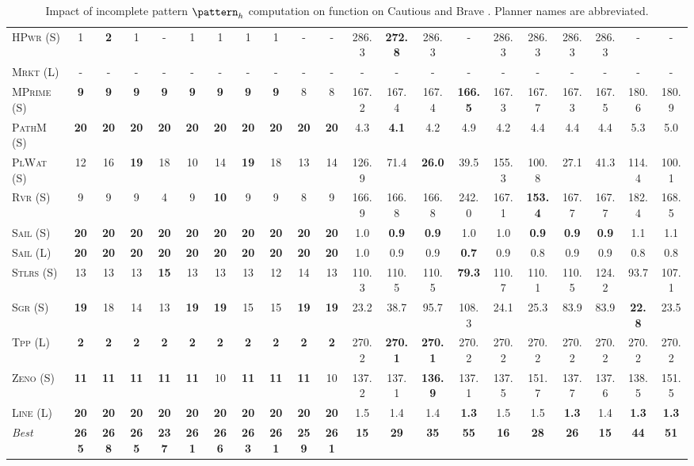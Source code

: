 \documentclass[11pt,landscape]{article}
\begin{document}
\begin{table}[tb]
{\begin{tabular}{|l||cccccccccc||cccccccccc||}
\textsc{HPwr} (S)&1&\textbf{2}&1&-&1&1&1&1&-&-&286.3&\textbf{272.8}&286.3&-&286.3&286.3&286.3&286.3&-&-\\
\textsc{Mrkt} (L)&-&-&-&-&-&-&-&-&-&-&-&-&-&-&-&-&-&-&-&-\\
\textsc{MPrime} (S)&\textbf{9}&\textbf{9}&\textbf{9}&\textbf{9}&\textbf{9}&\textbf{9}&\textbf{9}&\textbf{9}&8&8&167.2&167.4&167.4&\textbf{166.5}&167.3&167.7&167.3&167.5&180.6&180.9\\
\textsc{PathM} (S)&\textbf{20}&\textbf{20}&\textbf{20}&\textbf{20}&\textbf{20}&\textbf{20}&\textbf{20}&\textbf{20}&\textbf{20}&\textbf{20}&4.3&\textbf{4.1}&4.2&4.9&4.2&4.4&4.4&4.4&5.3&5.0\\
\textsc{PlWat} (S)&12&16&\textbf{19}&18&10&14&\textbf{19}&18&13&14&126.9&71.4&\textbf{26.0}&39.5&155.3&100.8&27.1&41.3&114.4&100.1\\
\textsc{Rvr} (S)&9&9&9&4&9&\textbf{10}&9&9&8&9&166.9&166.8&166.8&242.0&167.1&\textbf{153.4}&167.7&167.7&182.4&168.5\\
\textsc{Sail} (S)&\textbf{20}&\textbf{20}&\textbf{20}&\textbf{20}&\textbf{20}&\textbf{20}&\textbf{20}&\textbf{20}&\textbf{20}&\textbf{20}&1.0&\textbf{0.9}&\textbf{0.9}&1.0&1.0&\textbf{0.9}&\textbf{0.9}&\textbf{0.9}&1.1&1.1\\
\textsc{Sail} (L)&\textbf{20}&\textbf{20}&\textbf{20}&\textbf{20}&\textbf{20}&\textbf{20}&\textbf{20}&\textbf{20}&\textbf{20}&\textbf{20}&1.0&0.9&0.9&\textbf{0.7}&0.9&0.8&0.9&0.9&0.8&0.8\\
\textsc{Stlrs} (S)&13&13&13&\textbf{15}&13&13&13&12&14&13&110.3&110.5&110.5&\textbf{79.3}&110.7&110.1&110.5&124.2&93.7&107.1\\
\textsc{Sgr} (S)&\textbf{19}&18&14&13&\textbf{19}&\textbf{19}&15&15&\textbf{19}&\textbf{19}&23.2&38.7&95.7&108.3&24.1&25.3&83.9&83.9&\textbf{22.8}&23.5\\
\textsc{Tpp} (L)&\textbf{2}&\textbf{2}&\textbf{2}&\textbf{2}&\textbf{2}&\textbf{2}&\textbf{2}&\textbf{2}&\textbf{2}&\textbf{2}&270.2&\textbf{270.1}&\textbf{270.1}&270.2&270.2&270.2&270.2&270.2&270.2&270.2\\
\textsc{Zeno} (S)&\textbf{11}&\textbf{11}&\textbf{11}&\textbf{11}&\textbf{11}&10&\textbf{11}&\textbf{11}&\textbf{11}&10&137.2&137.1&\textbf{136.9}&137.1&137.5&151.7&137.7&137.6&138.5&151.5\\
\textsc{Line} (L)&\textbf{20}&\textbf{20}&\textbf{20}&\textbf{20}&\textbf{20}&\textbf{20}&\textbf{20}&\textbf{20}&\textbf{20}&\textbf{20}&1.5&1.4&1.4&\textbf{1.3}&1.5&1.5&\textbf{1.3}&1.4&\textbf{1.3}&\textbf{1.3}
\\\hline
\textit{Best}&\textbf{265}&\textbf{268}&\textbf{265}&\textbf{237}&\textbf{261}&\textbf{266}&\textbf{263}&\textbf{261}&\textbf{259}&\textbf{261}&\textbf{15}&\textbf{29}&\textbf{35}&\textbf{55}&\textbf{16}&\textbf{28}&\textbf{26}&\textbf{15}&\textbf{44}&\textbf{51}\\\hline

        \end{tabular}}
        \caption{Impact of incomplete pattern $\pattern_h$ computation on function on Cautious and Brave \pattyd. Planner names are abbreviated.}
        \label{tab:abl-patternh-incomplete}
        \end{table}
        
\end{document}
